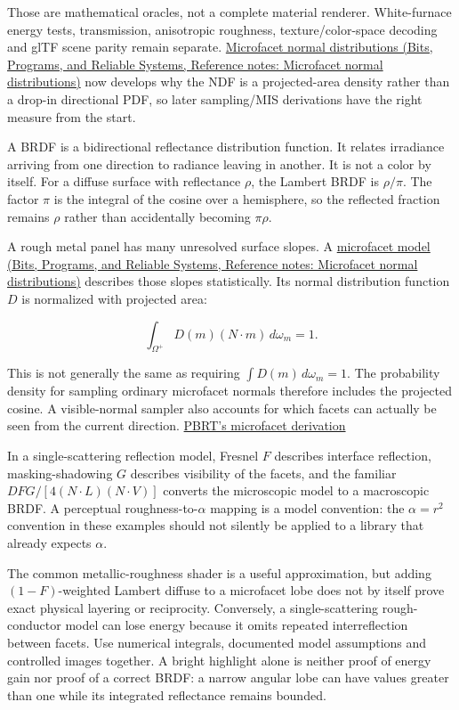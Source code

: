 Those are mathematical oracles, not a complete material renderer. White-furnace energy tests, transmission, anisotropic roughness, texture/color-space decoding and glTF scene parity remain separate. \href{../01-Bits-Programs-and-Reliable-Systems/main.pdf\#nameddest=appendix-885c1cb64ae9}{Microfacet normal distributions (Bits, Programs, and Reliable Systems, Reference notes: Microfacet normal distributions)} now develops why the NDF is a projected-area density rather than a drop-in directional PDF, so later sampling/MIS derivations have the right measure from the start.

A BRDF is a bidirectional reflectance distribution function. It relates irradiance arriving from one direction to radiance leaving in another. It is not a color by itself. For a diffuse surface with reflectance \(\rho\), the Lambert BRDF is \(\rho/\pi\). The factor \(\pi\) is the integral of the cosine over a hemisphere, so the reflected fraction remains \(\rho\) rather than accidentally becoming \(\pi\rho\).

A rough metal panel has many unresolved surface slopes. A \href{../01-Bits-Programs-and-Reliable-Systems/main.pdf\#nameddest=appendix-885c1cb64ae9}{microfacet model (Bits, Programs, and Reliable Systems, Reference notes: Microfacet normal distributions)} describes those slopes statistically. Its normal distribution function \(D\) is normalized with projected area:

\[
\int_{\Omega^+} D(m)(N\cdot m)\,d\omega_m=1.
\]

This is not generally the same as requiring \(\int D(m)\,d\omega_m=1\). The probability density for sampling ordinary microfacet normals therefore includes the projected cosine. A visible-normal sampler also accounts for which facets can actually be seen from the current direction. \href{https://pbr-book.org/4ed/Reflection_Models/Roughness_Using_Microfacet_Theory}{PBRT's microfacet derivation}

In a single-scattering reflection model, Fresnel \(F\) describes interface reflection, masking-shadowing \(G\) describes visibility of the facets, and the familiar \(DFG/[4(N\cdot L)(N\cdot V)]\) converts the microscopic model to a macroscopic BRDF. A perceptual roughness-to-\(\alpha\) mapping is a model convention: the \(\alpha=r^2\) convention in these examples should not silently be applied to a library that already expects \(\alpha\).

The common metallic-roughness shader is a useful approximation, but adding \((1-F)\)-weighted Lambert diffuse to a microfacet lobe does not by itself prove exact physical layering or reciprocity. Conversely, a single-scattering rough-conductor model can lose energy because it omits repeated interreflection between facets. Use numerical integrals, documented model assumptions and controlled images together. A bright highlight alone is neither proof of energy gain nor proof of a correct BRDF: a narrow angular lobe can have values greater than one while its integrated reflectance remains bounded.

